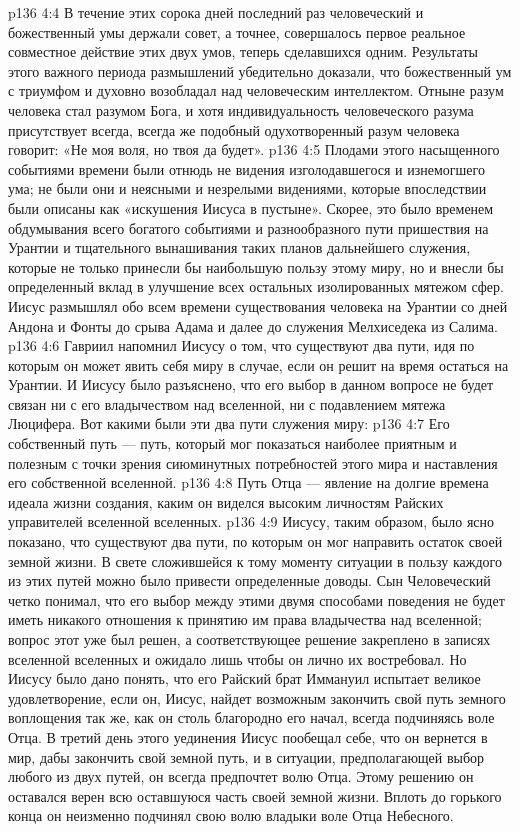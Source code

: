 \vs p136 4:4 \pc В течение этих сорока дней последний раз человеческий и божественный умы держали совет, а точнее, совершалось первое реальное совместное действие этих двух умов, теперь сделавшихся одним. Результаты этого важного периода размышлений убедительно доказали, что божественный ум с триумфом и духовно возобладал над человеческим интеллектом. Отныне разум человека стал разумом Бога, и хотя индивидуальность человеческого разума присутствует всегда, всегда же подобный одухотворенный разум человека говорит: «Не моя воля, но твоя да будет».
\vs p136 4:5 Плодами этого насыщенного событиями времени были отнюдь не видения изголодавшегося и изнемогшего ума; не были они и неясными и незрелыми видениями, которые впоследствии были описаны как «искушения Иисуса в пустыне». Скорее, это было временем обдумывания всего богатого событиями и разнообразного пути пришествия на Урантии и тщательного вынашивания таких планов дальнейшего служения, которые не только принесли бы наибольшую пользу этому миру, но и внесли бы определенный вклад в улучшение всех остальных изолированных мятежом сфер. Иисус размышлял обо всем времени существования человека на Урантии со дней Андона и Фонты до срыва Адама и далее до служения Мелхиседека из Салима.
\vs p136 4:6 Гавриил напомнил Иисусу о том, что существуют два пути, идя по которым он может явить себя миру в случае, если он решит на время остаться на Урантии. И Иисусу было разъяснено, что его выбор в данном вопросе не будет связан ни с его владычеством над вселенной, ни с подавлением мятежа Люцифера. Вот какими были эти два пути служения миру:
\vs p136 4:7 \bibnobreakspace Его собственный путь --- путь, который мог показаться наиболее приятным и полезным с точки зрения сиюминутных потребностей этого мира и наставления его собственной вселенной.
\vs p136 4:8 \bibnobreakspace Путь Отца --- явление на долгие времена идеала жизни создания, каким он виделся высоким личностям Райских управителей вселенной вселенных.
\vs p136 4:9 Иисусу, таким образом, было ясно показано, что существуют два пути, по которым он мог направить остаток своей земной жизни. В свете сложившейся к тому моменту ситуации в пользу каждого из этих путей можно было привести определенные доводы. Сын Человеческий четко понимал, что его выбор между этими двумя способами поведения не будет иметь никакого отношения к принятию им права владычества над вселенной; вопрос этот уже был решен, а соответствующее решение закреплено в записях вселенной вселенных и ожидало лишь чтобы он лично их востребовал. Но Иисусу было дано понять, что его Райский брат Иммануил испытает великое удовлетворение, если он, Иисус, найдет возможным закончить свой путь земного воплощения так же, как он столь благородно его начал, всегда подчиняясь воле Отца. В третий день этого уединения Иисус пообещал себе, что он вернется в мир, дабы закончить свой земной путь, и в ситуации, предполагающей выбор любого из двух путей, он всегда предпочтет волю Отца. Этому решению он оставался верен всю оставшуюся часть своей земной жизни. Вплоть до горького конца он неизменно подчинял свою волю владыки воле Отца Небесного.
